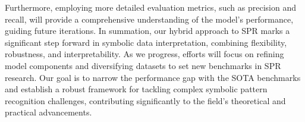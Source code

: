 \documentclass{article}
\begin{document}
Furthermore, employing more detailed evaluation metrics, such as precision and recall, will provide a comprehensive understanding of the model's performance, guiding future iterations. In summation, our hybrid approach to SPR marks a significant step forward in symbolic data interpretation, combining flexibility, robustness, and interpretability. As we progress, efforts will focus on refining model components and diversifying datasets to set new benchmarks in SPR research. Our goal is to narrow the performance gap with the SOTA benchmarks and establish a robust framework for tackling complex symbolic pattern recognition challenges, contributing significantly to the field’s theoretical and practical advancements.
\end{document}
